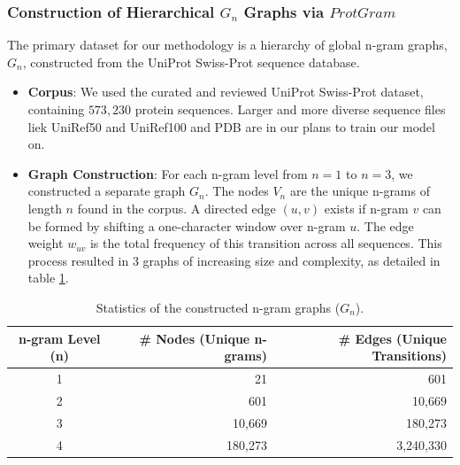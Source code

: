 \documentclass[utf8]{article}
\begin{document}
	\subsubsection{Construction of Hierarchical $G_{n}$ Graphs via $ProtGram$}
	The primary dataset for our methodology is a hierarchy of global n-gram graphs, $G_{n}$, constructed from the UniProt Swiss-Prot sequence database.
	\begin{itemize}
		\item \textbf{Corpus}: We used the curated and reviewed UniProt Swiss-Prot dataset, containing $573,230$ protein sequences. Larger and more diverse sequence files liek UniRef50 and UniRef100 and PDB are in our plans to train our model on.
		\item \textbf{Graph Construction}: For each n-gram level from $n=1$ to $n=3$, we constructed a separate graph $G_{n}$. The nodes $V_{n}$ are the unique n-grams of length $n$ found in the corpus. A directed edge $(u, v)$ exists if n-gram $v$ can be formed by shifting a one-character window over n-gram $u$. The edge weight $w_{uv}$ is the total frequency of this transition across all sequences. This process resulted in $3$ graphs of increasing size and complexity, as detailed in table \ref{tab:gn_stats}.
	\end{itemize}
	
	\begin{table}[h!]
		\centering
		\caption{Statistics of the constructed n-gram graphs ($G_{n}$).}
		\label{tab:gn_stats}
		\begin{tabular}{crr}
			\toprule
			\textbf{n-gram Level (n)} & \textbf{\# Nodes (Unique n-grams)} & \textbf{\# Edges (Unique Transitions)} \\
			\midrule
			1                         & 21                                 & 601                                    \\
			2                         & 601                                & 10,669                                 \\
			3                         & 10,669                             & 180,273                                \\
			4                         & 180,273                            & 3,240,330                              \\
			\bottomrule
		\end{tabular}
	\end{table}
	
\end{document}

